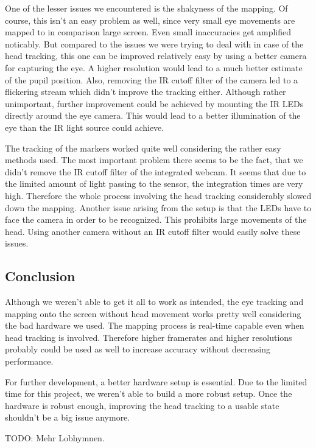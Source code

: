 One of the lesser issues we encountered is the shakyness of the mapping. 
Of course, this isn't an easy problem as well, since very small eye movements are mapped to in comparison large screen. 
Even small inaccuracies get amplified noticably. 
But compared to the issues we were trying to deal with in case of the head tracking, this one can be improved relatively easy by using a better camera for capturing the eye. 
A higher resolution would lead to a much better estimate of the pupil position. 
Also, removing the IR cutoff filter of the camera led to a flickering stream which didn't improve the tracking either. 
Although rather unimportant, further improvement could be achieved by mounting the IR LEDs directly around the eye camera. This would lead to a better illumination of the eye than the IR light source could achieve. 

The tracking of the markers worked quite well considering the rather easy methods used. 
The most important problem there seems to be the fact, that we didn't remove the IR cutoff filter of the integrated webcam. 
It seems that due to the limited amount of light passing to the sensor, the integration times are very high. 
Therefore the whole process involving the head tracking considerably slowed down the mapping. Another issue arising from the setup is that the LEDs have to face the camera in order to be recognized. This prohibits large movements of the head. Using another camera without an IR cutoff filter would easily solve these issues.

\subsection{Conclusion}
Although we weren't able to get it all to work as intended, the eye tracking and mapping onto the screen without head movement works pretty well considering the bad hardware we used. 
The mapping process is real-time capable even when head tracking is involved. 
Therefore higher framerates and higher resolutions probably could be used as well to increase accuracy without decreasing performance. 

For further development, a better hardware setup is essential. Due to the limited time for this project, we weren't able to build a more robust setup. 
Once the hardware is robust enough, improving the head tracking to a usable state shouldn't be a big issue anymore.

TODO: Mehr Lobhymnen.


